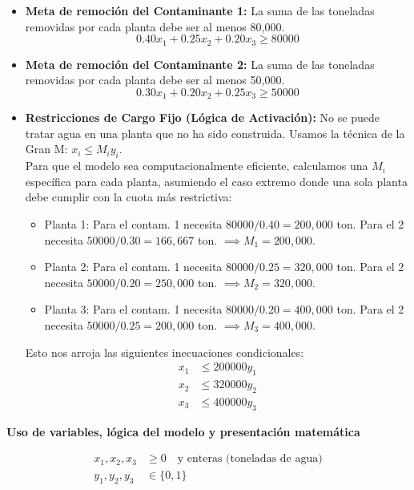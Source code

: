 \documentclass[10pt,a4paper]{article}
\begin{document}
\begin{itemize}
    \item \textbf{Meta de remoción del Contaminante 1:} La suma de las toneladas removidas por cada planta debe ser al menos 80,000.
    \[ 0.40x_1 + 0.25x_2 + 0.20x_3 \ge 80000 \]

    \item \textbf{Meta de remoción del Contaminante 2:} La suma de las toneladas removidas por cada planta debe ser al menos 50,000.
    \[ 0.30x_1 + 0.20x_2 + 0.25x_3 \ge 50000 \]

    \item \textbf{Restricciones de Cargo Fijo (Lógica de Activación):} No se puede tratar agua en una planta que no ha sido construida. Usamos la técnica de la Gran M: $x_i \le M_i y_i$. \\
    Para que el modelo sea computacionalmente eficiente, calculamos una $M_i$ específica para cada planta, asumiendo el caso extremo donde una sola planta debe cumplir con la cuota más restrictiva:
    \begin{itemize}
        \item Planta 1: Para el contam. 1 necesita $80000/0.40 = 200,000$ ton. Para el 2 necesita $50000/0.30 = 166,667$ ton. $\implies M_1 = 200,000$.
        \item Planta 2: Para el contam. 1 necesita $80000/0.25 = 320,000$ ton. Para el 2 necesita $50000/0.20 = 250,000$ ton. $\implies M_2 = 320,000$.
        \item Planta 3: Para el contam. 1 necesita $80000/0.20 = 400,000$ ton. Para el 2 necesita $50000/0.25 = 200,000$ ton. $\implies M_3 = 400,000$.
    \end{itemize}
    Esto nos arroja las siguientes inecuaciones condicionales:
    \begin{align*}
        x_1 &\le 200000y_1 \\
        x_2 &\le 320000y_2 \\
        x_3 &\le 400000y_3 
    \end{align*}
\end{itemize}

\vspace{3mm}
\textbf{Uso de variables, lógica del modelo y presentación matemática}

\begin{align*}
    x_1, x_2, x_3 &\ge 0 \quad \text{y enteras (toneladas de agua)} \\
    y_1, y_2, y_3 &\in \{0, 1\}
\end{align*}
\end{document}
